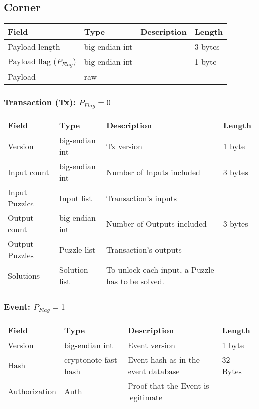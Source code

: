 \documentclass[a4paper,10pt]{article}
\begin{document}
        
        \subsection{Corner}
           \begin{tabularx}{\textwidth}{|l|l|X|l|}
            \hline Field & Type & Description & Length \\ \hline
            \hline Payload length & big-endian int &  & 3 bytes \\
            \hline Payload flag ($P_{Flag}$) & big-endian int &  & 1 byte \\
            \hline Payload & raw & & \\
            \hline
            \end{tabularx}
            
            
            \subsubsection{Transaction (Tx):  $P_{Flag} = 0$}
                \begin{tabularx}{\textwidth}{|l|l|X|l|}
                \hline Field & Type & Description & Length \\ \hline
                \hline Version & big-endian int & Tx version & 1 byte \\
                \hline Input count & big-endian int & Number of Inputs included & 3 bytes\\
                \hline Input Puzzles & Input list & Transaction's inputs & \\
                \hline Output count & big-endian int & Number of Outputs included & 3 bytes\\
                \hline Output Puzzles & Puzzle list & Transaction's outputs & \\
                \hline Solutions & Solution list & To unlock each input, a Puzzle has to be solved. & \\
                \hline
                \end{tabularx}
            
            
            \subsubsection{Event: $P_{Flag} = 1$}
                \begin{tabularx}{\textwidth}{|l|l|X|l|}
                \hline Field & Type & Description & Length \\ \hline
                \hline Version & big-endian int & Event version & 1 byte \\
                \hline Hash & cryptonote-fast-hash & Event hash as in the event database & 32 Bytes\\
                \hline Authorization & Auth & Proof that the Event is legitimate & \\
                \hline
                \end{tabularx}\\
        
\end{document}
